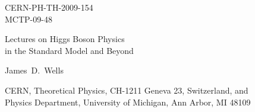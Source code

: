 \documentclass[12pt]{article}
\begin{document}
\setlength{\baselineskip}{0.22in}



\begin{titlepage}
\noindent
\begin{flushright}
{\small CERN-PH-TH-2009-154} \\
{\small MCTP-09-48}  \\
\end{flushright}
\vspace{-.5cm}

\begin{center}
  \begin{Large}
    \begin{bf}


 {Lectures on Higgs Boson Physics \\ in the Standard Model and Beyond}\vspace{0.2cm}\\
     \end{bf}
  \end{Large}
\end{center}
%
\vspace{0.2cm}
\begin{center}
\begin{large}
James~D.~Wells
\end{large}
  \vspace{0.3cm}
  \begin{it}

CERN, Theoretical Physics, CH-1211 Geneva 23, Switzerland, and \\
Physics Department, University of Michigan, Ann Arbor, MI 48109

 \vspace{0.1cm}
\end{it}

\end{center}



\end{titlepage}
\end{document}
